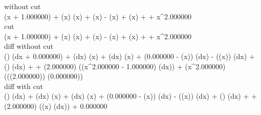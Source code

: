 without cut
\\
\ln(x + 1.000000) + (x) \cdot (x) + \cos(x) - \sin(x) + \tg(x) +  + x^{2.000000}
\\
cut
\\
\ln(x + 1.000000) + (x) \cdot (x) + \cos(x) - \sin(x) + \tg(x) +  + x^{2.000000}
\\
diff without cut
\\
() \cdot (dx + 0.000000) + (dx) \cdot (x) + (dx) \cdot (x) + (0.000000 - \sin(x)) \cdot (dx) - (\cos(x)) \cdot (dx) + () \cdot (dx) +  + (2.000000) \cdot ((x^{2.000000 - 1.000000}) \cdot (dx)) + (x^{2.000000}) \cdot ((\ln(2.000000)) \cdot (0.000000))
\\
diff with cut
\\
() \cdot (dx) + (dx) \cdot (x) + (dx) \cdot (x) + (0.000000 - \sin(x)) \cdot (dx) - (\cos(x)) \cdot (dx) + () \cdot (dx) +  + (2.000000) \cdot ((x) \cdot (dx)) + 0.000000
\\
